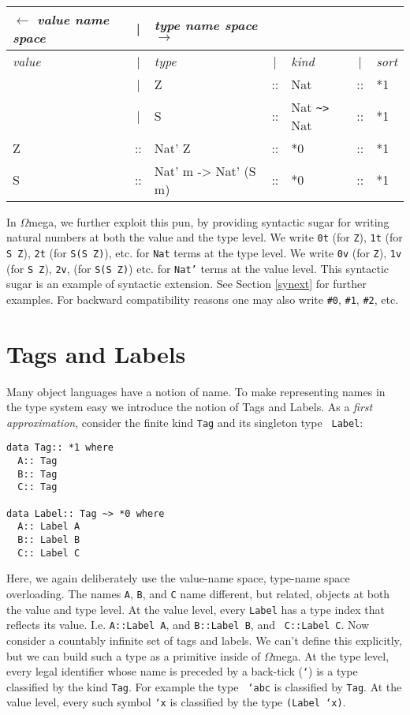 \documentclass[11pt,twoside]{article}
\newcommand{\om}{$\Omega$mega}
\begin{document}
\vspace*{.15in}
{\tt
\begin{tabular}{|lclclcl|} \hline
  $\leftarrow$     {\it {\tiny value name space}}&|& {\it {\tiny type name space $\rightarrow$}} & &  && \\ \hline
{\em value}&|& {\em type} &|&  {\em kind} &|& {\em sort} \\ \hline
     & |& Z        &::& Nat &::& *1 \\
     & |& S        &::& Nat \verb+~>+ Nat &::& *1 \\   \hline  
Z &::& Nat' Z &::& *0 &::& *1 \\
S &::& Nat' m -> Nat' (S m) &::& *0 &::& *1 \\
\hline
\end{tabular}}
\vspace*{.15in}


In \om, we further exploit this pun, by providing syntactic sugar for writing
natural numbers at both the value and the type level. We write {\tt 0t} (for
{\tt Z}), {\tt 1t} (for {\tt S Z}), {\tt 2t} (for {\tt S(S Z)}), etc. for
{\tt Nat} terms at the type level. We write {\tt 0v} (for {\tt Z}), {\tt 1v} 
(for {\tt S Z}), {\tt 2v}, (for {\tt S(S Z)}) etc. for {\tt Nat'} 
terms at the value level. This syntactic sugar is an example of 
syntactic extension. See Section \ref{synext} for further examples.
For backward compatibility reasons one may also write {\tt \#0},
{\tt \#1}, {\tt \#2}, etc.

\section {Tags and Labels} \label{tag}

Many object languages have a notion of name. To make representing names in the
type system easy we introduce the notion of Tags and Labels. As a {\em first
approximation}, consider the finite kind {\tt Tag} and its singleton type {\tt
Label}:

\begin{verbatim}
data Tag:: *1 where
  A:: Tag
  B:: Tag
  C:: Tag

data Label:: Tag ~> *0 where
  A:: Label A
  B:: Label B
  C:: Label C
\end{verbatim}

Here, we again deliberately use the value-name space, type-name space
overloading. The names {\tt A}, {\tt B}, and {\tt C} name different,
but related, objects at both the value and type level.
At the value level, every {\tt Label} has a type index
that reflects its value. I.e. {\tt A::Label A}, and {\tt B::Label B}, and {\tt
C::Label C}. Now consider a countably infinite set of tags and labels. We can't
define this explicitly, but we can build such a type as a primitive inside of
\om. At the type level, every legal identifier whose name is preceded by a
back-tick ({\tt `}) is a type classified by the kind {\tt Tag}. For example the type {\tt
`abc} is classified by {\tt Tag}. At the value level, every such symbol {\tt `x} is classified
by the type {\tt (Label `x)}.
\end{document}
